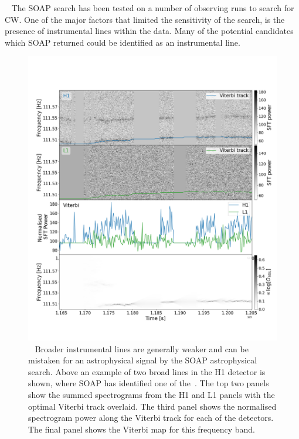 % 
~ The SOAP search has been tested on a number of observing runs
to search for \gls{CW}.  One of the major factors that limited the sensitivity
of the search, is the presence of instrumental lines within the data.  Many of
the potential candidates which SOAP returned could be identified as an
instrumental line.
%
\begin{figure}[hp]
	\includegraphics[width=\textwidth]{C6_detchar/plot_F111_5_wandering_line.png}
        \caption[Broad wandering line example.]{~ Broader
			instrumental lines are generally weaker and can be mistaken for an
			astrophysical signal by the SOAP astrophysical search. Above an example of two
			broad lines in the H1 detector is shown, where SOAP has identified one of
			the~.
			The top two panels show the summed spectrograms from the H1 and L1 panels with
			the optimal Viterbi track overlaid. The third panel shows the normalised
			spectrogram power along the Viterbi track for each of the detectors. The final
			panel shows the Viterbi map for this frequency band.~
			}
\label{detchar:soap:astrowander}

\end{figure}
